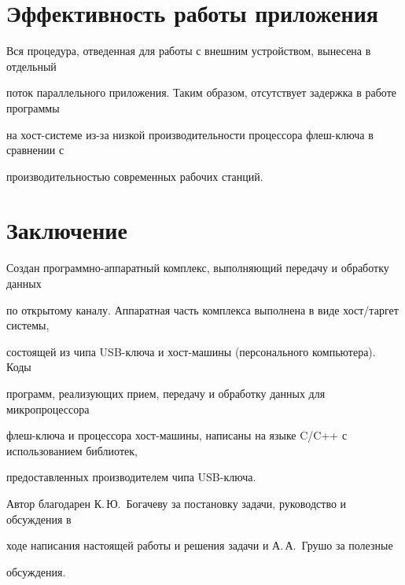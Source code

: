 \section{Эффективность работы приложения}


    


    Вся процедура, отведенная для работы с внешним устройством, вынесена в отдельный 


поток параллельного приложения. Таким образом, отсутствует задержка в работе программы 


на хост-системе из-за низкой про\-из\-во\-ди\-тель\-ности процессора флеш-ключа в сравнении с 


производительностью современных рабочих станций.





\section{Заключение}





    Создан программно-аппаратный комплекс, выполняющий передачу и обработку данных 


по открытому каналу. Аппаратная часть комплекса выполнена в виде хост/таргет системы, 


состоящей из чипа USB-ключа и хост-машины (персонального компьютера). Коды 


программ, реализующих прием, передачу и обработку данных для микропроцессора 


флеш-клю\-ча и процессора хост-ма\-ши\-ны, написаны на языке C/C++ с использованием библиотек, 


предоставленных производителем чипа USB-ключа.


    


    \bigskip


    


    Автор благодарен К.\,Ю.~Богачеву за постановку задачи, руководство и обсуждения в 


ходе написания настоящей работы и решения задачи и А.\,А.~Грушо за полезные 


обсуждения.





